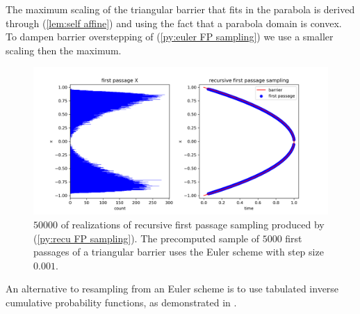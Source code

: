 \documentclass[a4paper,12pt]{article}
\begin{document}
\begin{pythonn} \label{py:recu FP sampling}
    The maximum scaling of the triangular barrier that fits
    in the parabola is derived through (\ref{lem:self affine})
    and using the fact that a parabola domain is convex. To dampen barrier
    overstepping of (\ref{py:euler FP sampling}) we use a smaller scaling
    then the maximum. \\

    \begin{figure}[ht!]
        \centering
        \includegraphics[width=1\textwidth]{plots/recursive first passage para.png}
        \caption{ $50000$ of realizations of recursive first passage sampling produced
            by (\ref{py:recu FP sampling}). The precomputed sample of $5000$ first
            passages of a triangular barrier uses the Euler scheme with
            step size $0.001$.}
        \label{fig:recursive first passage para}
    \end{figure}
\end{pythonn}

\begin{related}
    An alternative to resampling from an Euler scheme is to use tabulated
    inverse cumulative probability functions,
    as demonstrated in \cite{hwang_simulationtabulation_2001}.
\end{related}

\end{document}
